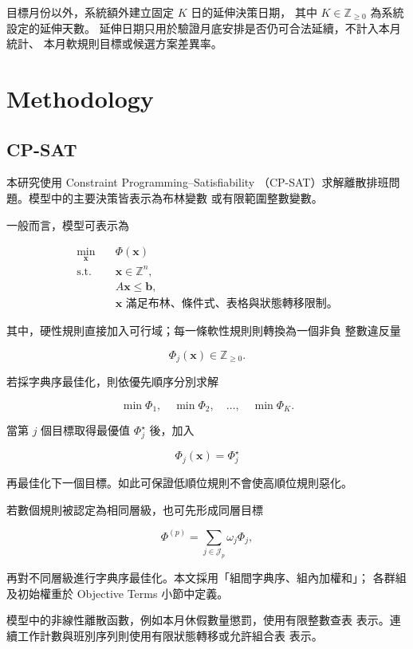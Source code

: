 \documentclass[12pt]{article}
\begin{document}
目標月份以外，系統額外建立固定 \(K\) 日的延伸決策日期，
其中 \(K\in\mathbb{Z}_{\geq 0}\) 為系統設定的延伸天數。
延伸日期只用於驗證月底安排是否仍可合法延續，不計入本月統計、
本月軟規則目標或候選方案差異率。

\section{Methodology}

\subsection{CP-SAT}

本研究使用 Constraint Programming--Satisfiability
（CP-SAT）求解離散排班問題。模型中的主要決策皆表示為布林變數
或有限範圍整數變數。

一般而言，模型可表示為

\[
  \begin{aligned}
    \min_{\mathbf{x}}\quad
    & \Phi(\mathbf{x}) \\
    \text{s.t.}\quad
    & \mathbf{x}\in\mathbb{Z}^{n},\\
    & A\mathbf{x}\leq \mathbf{b},\\
    & \mathbf{x}\text{ 滿足布林、條件式、表格與狀態轉移限制。}
  \end{aligned}
\]

其中，硬性規則直接加入可行域；每一條軟性規則則轉換為一個非負
整數違反量

\[
  \Phi_j(\mathbf{x})\in\mathbb{Z}_{\geq 0}.
\]

若採字典序最佳化，則依優先順序分別求解

\[
  \min \Phi_1,\quad
  \min \Phi_2,\quad
  \dots,\quad
  \min \Phi_K.
\]

當第 \(j\) 個目標取得最優值 \(\Phi_j^\star\) 後，加入

\[
  \Phi_j(\mathbf{x})=\Phi_j^\star
\]

再最佳化下一個目標。如此可保證低順位規則不會使高順位規則惡化。

若數個規則被認定為相同層級，也可先形成同層目標

\[
  \Phi^{(p)}
  =
  \sum_{j\in\mathcal{J}_p}
  \omega_j\Phi_j,
\]

再對不同層級進行字典序最佳化。本文採用「組間字典序、組內加權和」；
各群組及初始權重於 Objective Terms 小節中定義。

模型中的非線性離散函數，例如本月休假數量懲罰，使用有限整數查表
表示。連續工作計數與班別序列則使用有限狀態轉移或允許組合表
表示。
\end{document}
